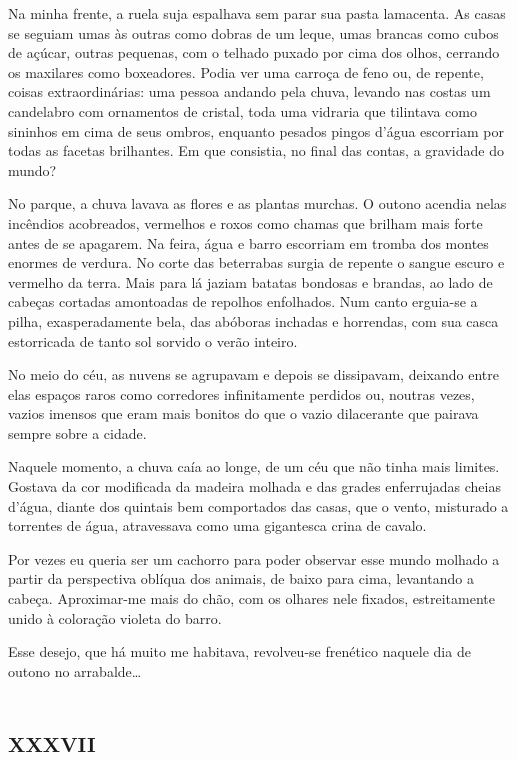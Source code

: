 Na minha frente, a ruela suja espalhava sem parar sua pasta lamacenta. As casas se seguiam umas às outras como dobras de um leque, umas brancas como cubos de açúcar, outras pequenas, com o telhado puxado por cima dos olhos, cerrando os maxilares como boxeadores. Podia ver uma carroça de feno ou, de repente, coisas extraordinárias: uma pessoa andando pela chuva, levando nas costas um candelabro com ornamentos de cristal, toda uma vidraria que tilintava como sininhos em cima de seus ombros, enquanto pesados pingos d'água escorriam por todas as facetas brilhantes. Em que consistia, no final das contas, a gravidade do mundo?

No parque, a chuva lavava as flores e as plantas murchas. O outono acendia nelas incêndios acobreados, vermelhos e roxos como chamas que brilham mais forte antes de se apagarem. Na feira, água e barro escorriam em tromba dos montes enormes de verdura. No corte das beterrabas surgia de repente o sangue escuro e vermelho da terra. Mais para lá jaziam batatas bondosas e brandas, ao lado de cabeças cortadas amontoadas de repolhos enfolhados. Num canto erguia-se a pilha, exasperadamente bela, das abóboras inchadas e horrendas, com sua casca estorricada de tanto sol sorvido o verão inteiro.

No meio do céu, as nuvens se agrupavam e depois se dissipavam, deixando entre elas espaços raros como corredores infinitamente perdidos ou, noutras vezes, vazios imensos que eram mais bonitos do que o vazio dilacerante que pairava sempre sobre a cidade.

Naquele momento, a chuva caía ao longe, de um céu que não tinha mais limites. Gostava da cor modificada da madeira molhada e das grades enferrujadas cheias d'água, diante dos quintais bem comportados das casas, que o vento, misturado a torrentes de água, atravessava como uma gigantesca crina de cavalo.

Por vezes eu queria ser um cachorro para poder observar esse mundo molhado a partir da perspectiva oblíqua dos animais, de baixo para cima, levantando a cabeça. Aproximar-me mais do chão, com os olhares nele fixados, estreitamente unido à coloração violeta do barro.

Esse desejo, que há muito me habitava, revolveu-se frenético naquele dia de outono no arrabalde\dots


\chapter*{\huge\centering\textsc{xxxvii}}

